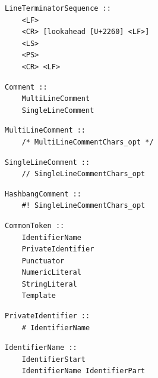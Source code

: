 \noindent\textbf{\texttt{}}\par
\begin{lstlisting}
LineTerminatorSequence ::
    <LF>
    <CR> [lookahead [U+2260] <LF>]
    <LS>
    <PS>
    <CR> <LF>
\end{lstlisting}

\noindent\textbf{\texttt{}}\par
\begin{lstlisting}
Comment ::
    MultiLineComment
    SingleLineComment
\end{lstlisting}

\noindent\textbf{\texttt{}}\par
\begin{lstlisting}
MultiLineComment ::
    /* MultiLineCommentChars_opt */
\end{lstlisting}

\noindent\textbf{\texttt{}}\par
\begin{lstlisting}
SingleLineComment ::
    // SingleLineCommentChars_opt
\end{lstlisting}

\noindent\textbf{\texttt{}}\par
\begin{lstlisting}
HashbangComment ::
    #! SingleLineCommentChars_opt
\end{lstlisting}

\noindent\textbf{\texttt{}}\par
\begin{lstlisting}
CommonToken ::
    IdentifierName
    PrivateIdentifier
    Punctuator
    NumericLiteral
    StringLiteral
    Template
\end{lstlisting}

\noindent\textbf{\texttt{}}\par
\begin{lstlisting}
PrivateIdentifier ::
    # IdentifierName
\end{lstlisting}

\noindent\textbf{\texttt{}}\par
\begin{lstlisting}
IdentifierName ::
    IdentifierStart
    IdentifierName IdentifierPart
\end{lstlisting}

